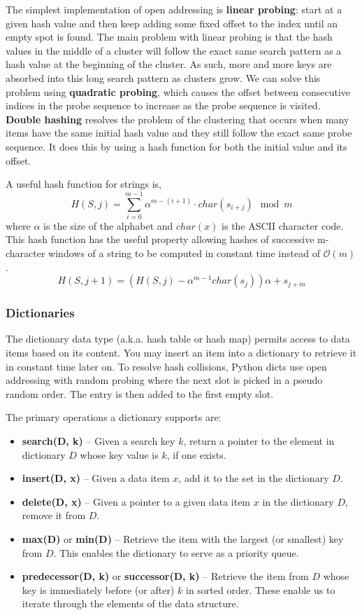 \documentclass{article}
\newcommand{\bigO}{\mathcal{O}}
\begin{document}
    The simplest implementation of open addressing is \textbf{linear probing}: start at a given hash value and then keep adding some fixed offset to the index until an empty spot is found. The main problem with linear probing is that the hash values in the middle of a cluster will follow the exact same search pattern as a hash value at the beginning of the cluster. As such, more and more keys are absorbed into this long search pattern as clusters grow. We can solve this problem using \textbf{quadratic probing}, which causes the offset between consecutive indices in the probe sequence to increase as the probe sequence is visited. \textbf{Double hashing} resolves the problem of the clustering that occurs when many items have the same initial hash value and they still follow the exact same probe sequence. It does this by using a hash function for both the initial value and its offset.

    A useful hash function for strings is,
    \[
        H(S,j) = \sum_{i=0}^{m-1} \alpha^{m-(i+1)} \cdot char(s_{i+j}) \mod m
    \]
    where $\alpha$ is the size of the alphabet and $char(x)$ is the ASCII character code. This hash function has the useful property allowing hashes of successive m-character windows of a string to be computed in constant time instead of $\bigO(m)$.
    \[
        H(S, j+1) = (H(S,j) - \alpha^{m-1}char(s_j))\alpha + s_{j+m}
    \]
    
    \subsubsection{Dictionaries}
    The dictionary data type (a.k.a. hash table or hash map) permits access to data items based on its content. You may insert an item into a dictionary to retrieve it in constant time later on. To resolve hash collisions, Python dicts use open addressing with random probing where the next slot is picked in a pseudo random order. The entry is then added to the first empty slot.
    
    The primary operations a dictionary supports are:
    \begin{itemize}
        \item  \textbf{search(D, k)} – Given a search key $k$, return a pointer to the element in dictionary $D$ whose key value is $k$, if one exists.
        \item \textbf{insert(D, x)} – Given a data item $x$, add it to the set in the dictionary $D$.
        \item \textbf{delete(D, x)} – Given a pointer to a given data item $x$ in the dictionary $D$, remove it from $D$.
        \item \textbf{max(D)} or \textbf{min(D)} – Retrieve the item with the largest (or smallest) key from $D$. This enables the dictionary to serve as a priority queue.
        \item \textbf{predecessor(D, k)} or \textbf{successor(D, k)} – Retrieve the item from $D$ whose key is immediately before (or after) $k$ in sorted order. These enable us to iterate through the elements of the data structure.
    \end{itemize}
    
\end{document}
